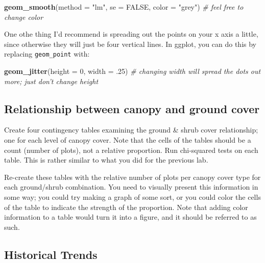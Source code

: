 \documentclass[]{book}
\newenvironment{Shaded}{\begin{snugshade}}{\end{snugshade}}
\newcommand{\KeywordTok}[1]{\textcolor[rgb]{0.13,0.29,0.53}{\textbf{#1}}}
\newcommand{\DataTypeTok}[1]{\textcolor[rgb]{0.13,0.29,0.53}{#1}}
\newcommand{\DecValTok}[1]{\textcolor[rgb]{0.00,0.00,0.81}{#1}}
\newcommand{\StringTok}[1]{\textcolor[rgb]{0.31,0.60,0.02}{#1}}
\newcommand{\CommentTok}[1]{\textcolor[rgb]{0.56,0.35,0.01}{\textit{#1}}}
\newcommand{\OtherTok}[1]{\textcolor[rgb]{0.56,0.35,0.01}{#1}}
\newcommand{\NormalTok}[1]{#1}
\begin{document}
\begin{Shaded}
\begin{Highlighting}[]
  \KeywordTok{geom_smooth}\NormalTok{(}\DataTypeTok{method =} \StringTok{"lm"}\NormalTok{, }\DataTypeTok{se =} \OtherTok{FALSE}\NormalTok{, }\DataTypeTok{color =} \StringTok{"grey"}\NormalTok{) }
  \CommentTok{# feel free to change color}
\end{Highlighting}
\end{Shaded}

One othe thing I'd recommend is spreading out the points on your x axis
a little, since otherwise they will just be four vertical lines. In
ggplot, you can do this by replacing \texttt{geom\_point} with:

\begin{Shaded}
\begin{Highlighting}[]
  \KeywordTok{geom_jitter}\NormalTok{(}\DataTypeTok{height =} \DecValTok{0}\NormalTok{, }\DataTypeTok{width =}\NormalTok{ .}\DecValTok{25}\NormalTok{) }
  \CommentTok{# changing width will spread the dots out more; just don't change height}
\end{Highlighting}
\end{Shaded}

\subsection{Relationship between canopy and ground
cover}\label{relationship-between-canopy-and-ground-cover}

Create four contingency tables examining the ground \& shrub cover
relationship; one for each level of canopy cover. Note that the cells of
the tables should be a count (number of plots), not a relative
proportion. Run chi-squared tests on each table. This is rather similar
to what you did for the previous lab.

Re-create these tables with the relative number of plots per canopy
cover type for each ground/shrub combination. You need to visually
present this information in some way; you could try making a graph of
some sort, or you could color the cells of the table to indicate the
strength of the proportion. Note that adding color information to a
table would turn it into a figure, and it should be referred to as such.

\subsection{Historical Trends}\label{historical-trends}
\end{document}
